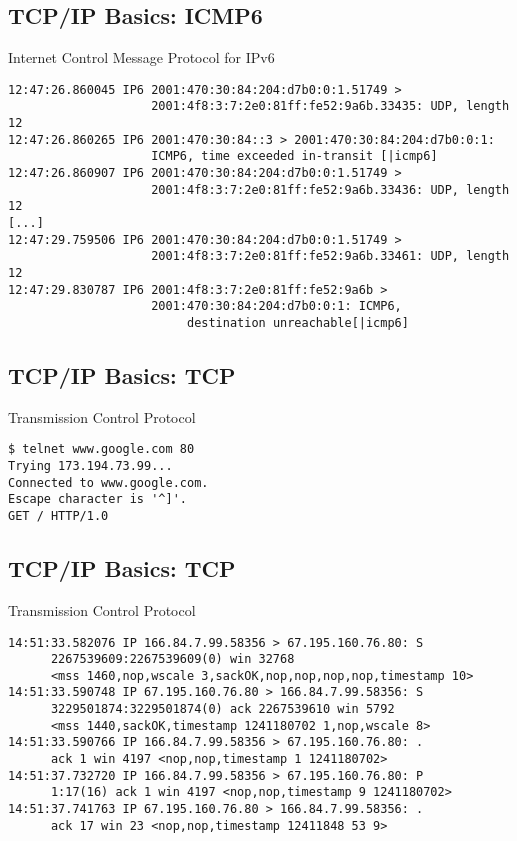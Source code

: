 \documentclass[xga]{xdvislides}
\begin{document}
\subsection{TCP/IP Basics: ICMP6}
\begin{center}
Internet Control Message Protocol for IPv6
\end{center}

\begin{verbatim}
12:47:26.860045 IP6 2001:470:30:84:204:d7b0:0:1.51749 >
                    2001:4f8:3:7:2e0:81ff:fe52:9a6b.33435: UDP, length 12
12:47:26.860265 IP6 2001:470:30:84::3 > 2001:470:30:84:204:d7b0:0:1:
                    ICMP6, time exceeded in-transit [|icmp6]
12:47:26.860907 IP6 2001:470:30:84:204:d7b0:0:1.51749 >
                    2001:4f8:3:7:2e0:81ff:fe52:9a6b.33436: UDP, length 12
[...]
12:47:29.759506 IP6 2001:470:30:84:204:d7b0:0:1.51749 >
                    2001:4f8:3:7:2e0:81ff:fe52:9a6b.33461: UDP, length 12
12:47:29.830787 IP6 2001:4f8:3:7:2e0:81ff:fe52:9a6b >
                    2001:470:30:84:204:d7b0:0:1: ICMP6,
                         destination unreachable[|icmp6]
\end{verbatim}

\subsection{TCP/IP Basics: TCP}
\begin{center}
Transmission Control Protocol
\end{center}
\vspace{.2in}
\begin{verbatim}
$ telnet www.google.com 80
Trying 173.194.73.99...
Connected to www.google.com.
Escape character is '^]'.
GET / HTTP/1.0

\end{verbatim}

\subsection{TCP/IP Basics: TCP}
\begin{center}
Transmission Control Protocol
\end{center}
\vspace{.2in}
\begin{verbatim}
14:51:33.582076 IP 166.84.7.99.58356 > 67.195.160.76.80: S
      2267539609:2267539609(0) win 32768
      <mss 1460,nop,wscale 3,sackOK,nop,nop,nop,nop,timestamp 10>
14:51:33.590748 IP 67.195.160.76.80 > 166.84.7.99.58356: S
      3229501874:3229501874(0) ack 2267539610 win 5792
      <mss 1440,sackOK,timestamp 1241180702 1,nop,wscale 8>
14:51:33.590766 IP 166.84.7.99.58356 > 67.195.160.76.80: .
      ack 1 win 4197 <nop,nop,timestamp 1 1241180702>
14:51:37.732720 IP 166.84.7.99.58356 > 67.195.160.76.80: P
      1:17(16) ack 1 win 4197 <nop,nop,timestamp 9 1241180702>
14:51:37.741763 IP 67.195.160.76.80 > 166.84.7.99.58356: .
      ack 17 win 23 <nop,nop,timestamp 12411848 53 9>
\end{verbatim}
\end{document}
